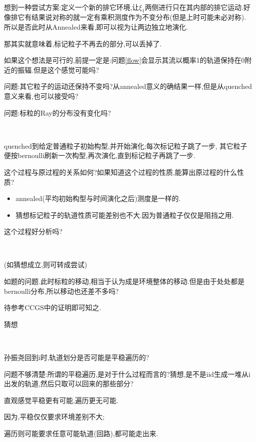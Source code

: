 \documentclass[a4paper,oneside]{ctexbook}
\begin{document}
					\begin{tri}[拆成两部分不相关的排它环境]
						\label{separate}
						\ 

						想到一种尝试方案:定义一个新的排它环境,让$\xi_1$两侧进行只在其内部的排它运动.好像排它有结果说对称的就一定有乘积测度作为不变分布(但是上时可能未必对称).所以是否此时从Annealed来看,即可以视为让两边独立地演化.

						那其实就意味着,标记粒子不再去的部分,可以丢掉了.

						如果这个想法是可行的,前提一定是:问题\ref{flow}会显示其流以概率1的轨道保持在0附近的振辐.但是这个感觉可能吗?

						问题:其它粒子的运动还保持不变吗?从annealed意义的确结果一样,但是从quenched意义来看,也可以接受吗?

						问题:标粒的Ray的分布没有变化吗?
					\end{tri}

					\begin{conjec}[刷新过程]
						\label{refresh}
						\ 

						quenched到给定普通粒子初始构型,并开始演化;每次标记粒子跳了一步, 其它粒子便按bernoulli刷新一次构型,再次演化,直到标记粒子再跳了一步.

						这个过程与原过程的关系如何?如果知道这个过程的性质,能算出原过程的什么性质?

						\begin{itemize}
						\item annealed(平均初始构型与时间演化之后)测度是一样的.
						\item 猜想标记粒子的轨道性质可能差别也不大.因为普通粒子仅仅是阻挡之用.
						\end{itemize}

						这个过程好分析吗?

					\end{conjec}

					\begin{conjec}
						\label{free tagged}
						\ 

						(如猜想成立,则可转成尝试)

						如题的问题.此时标粒的移动,相当于认为成是环境整体的移动.但是由于处处都是bernoulli分布,所以移动也还差不多吗?

						待参考CCGS中的证明即可知之.

						猜想
					\end{conjec}

					\begin{conjec}[轨道划分的角度来看]
						\label{pathcut}
						\ 

						孙振尧回到i时,轨道划分是否可能是平稳遍历的?

						问题不够清楚:所谓的平稳遍历,是对于什么过程而言的?猜想,是不是iid生成一堆从i出发的轨道,然后只取可以回来的那些部分?

						直观感觉平稳更有可能,遍历更无可能.

						因为,平稳仅仅要求环境差别不大;

						遍历则可能要求任意可能轨道(回路),都可能走出来.

					\end{conjec}
\end{document}
